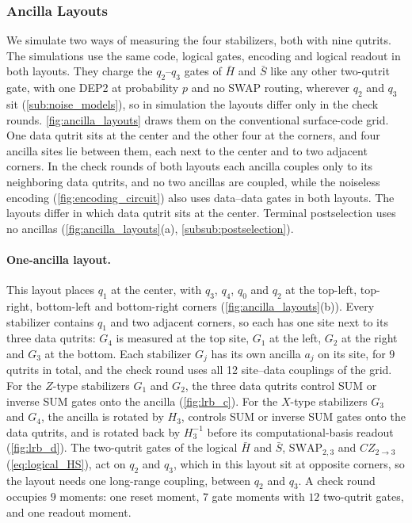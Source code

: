 \subsubsection{Ancilla Layouts}
\label{sub:ancilla_layouts}

We simulate two ways of measuring the four stabilizers, both with nine qutrits. The simulations use the same code, logical gates, encoding and logical readout in both layouts. They charge the $q_2$--$q_3$ gates of $\bar H$ and $\bar S$ like any other two-qutrit gate, with one DEP2 at probability $p$ and no SWAP routing, wherever $q_2$ and $q_3$ sit (\autoref{sub:noise_models}), so in simulation the layouts differ only in the check rounds. \autoref{fig:ancilla_layouts} draws them on the conventional surface-code grid. One data qutrit sits at the center and the other four at the corners, and four ancilla sites lie between them, each next to the center and to two adjacent corners. In the check rounds of both layouts each ancilla couples only to its neighboring data qutrits, and no two ancillas are coupled, while the noiseless encoding (\autoref{fig:encoding_circuit}) also uses data--data gates in both layouts. The layouts differ in which data qutrit sits at the center. Terminal postselection uses no ancillas (\autoref{fig:ancilla_layouts}(a), \autoref{subsub:postselection}).



\paragraph{One-ancilla layout.} This layout places $q_1$ at the center, with $q_3$, $q_4$, $q_0$ and $q_2$ at the top-left, top-right, bottom-left and bottom-right corners (\autoref{fig:ancilla_layouts}(b)). Every stabilizer contains $q_1$ and two adjacent corners, so each has one site next to its three data qutrits: $G_4$ is measured at the top site, $G_1$ at the left, $G_2$ at the right and $G_3$ at the bottom. Each stabilizer $G_j$ has its own ancilla $a_j$ on its site, for $9$ qutrits in total, and the check round uses all 12 site--data couplings of the grid. For the $Z$-type stabilizers $G_1$ and $G_2$, the three data qutrits control SUM or inverse SUM gates onto the ancilla (\autoref{fig:lrb_c}). For the $X$-type stabilizers $G_3$ and $G_4$, the ancilla is rotated by $H_3$, controls SUM or inverse SUM gates onto the data qutrits, and is rotated back by $H_3^{-1}$ before its computational-basis readout (\autoref{fig:lrb_d}). The two-qutrit gates of the logical $\bar H$ and $\bar S$, $\mathrm{SWAP}_{2,3}$ and $CZ_{2\rightarrow 3}$ (\autoref{eq:logical_HS}), act on $q_2$ and $q_3$, which in this layout sit at opposite corners, so the layout needs one long-range coupling, between $q_2$ and $q_3$. A check round occupies $9$ moments: one reset moment, $7$ gate moments with $12$ two-qutrit gates, and one readout moment.

